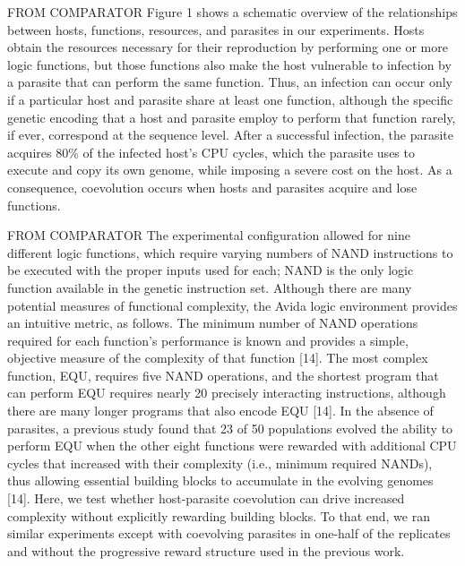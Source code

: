 FROM COMPARATOR
Figure 1 shows a schematic overview of the relationships between
hosts, functions, resources, and parasites in our experiments. Hosts
obtain the resources necessary for their reproduction by performing
one or more logic functions, but those functions also make the host
vulnerable to infection by a parasite that can perform the same
function. Thus, an infection can occur only if a particular host and
parasite share at least one function, although the specific genetic
encoding that a host and parasite employ to perform that function
rarely, if ever, correspond at the sequence level. After a successful
infection, the parasite acquires 80\% of the infected host’s CPU
cycles, which the parasite uses to execute and copy its own genome,
while imposing a severe cost on the host. As a consequence,
coevolution occurs when hosts and parasites acquire and lose
functions.

FROM COMPARATOR
The experimental configuration allowed for nine different logic
functions, which require varying numbers of NAND instructions
to be executed with the proper inputs used for each; NAND is the
only logic function available in the genetic instruction set. Although
there are many potential measures of functional complexity, the
Avida logic environment provides an intuitive metric, as follows.
The minimum number of NAND operations required for each
function’s performance is known and provides a simple, objective
measure of the complexity of that function [14]. The most complex
function, EQU, requires five NAND operations, and the shortest
program that can perform EQU requires nearly 20 precisely
interacting instructions, although there are many longer programs
that also encode EQU [14]. In the absence of parasites, a previous
study found that 23 of 50 populations evolved the ability to perform
EQU when the other eight functions were rewarded with additional
CPU cycles that increased with their complexity (i.e., minimum required NANDs), thus allowing essential building blocks to
accumulate in the evolving genomes [14]. Here, we test whether
host-parasite coevolution can drive increased complexity without
explicitly rewarding building blocks. To that end, we ran similar
experiments except with coevolving parasites in one-half of the
replicates and without the progressive reward structure used in the
previous work.



